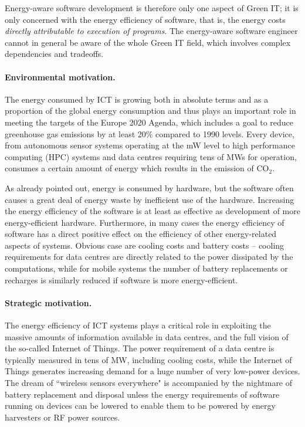 \documentclass[oneside]{book}
\begin{document}
Energy-aware software development is therefore only one aspect of Green IT;  it is only concerned with the energy efficiency of software, that is, the energy costs \emph{directly attributable to execution of programs}. The energy-aware software engineer cannot in general be aware of the whole Green IT field, which involves complex dependencies and tradeoffs. 



\paragraph{Environmental motivation.}
The energy consumed by ICT is growing both in absolute terms and as a proportion of the global energy consumption and thus plays an important role in meeting the targets of the Europe 2020 Agenda, which includes a goal to reduce greenhouse gas emissions by at least 20\% compared to 1990 levels.   Every device, from autonomous sensor systems operating at the mW level to high performance computing (HPC) systems and data centres requiring tens of MWs for operation, consumes a certain amount of energy which results in the emission of CO$_2$. 

As already pointed out, energy is consumed by hardware, but the software often causes a great deal of energy waste by inefficient use of the hardware.  Increasing the energy efficiency of the software is at least as effective as development of more energy-efficient hardware.
Furthermore, in many cases the energy efficiency of software has a direct positive effect on the efficiency of other energy-related aspects of systems.  Obvious case are cooling costs and battery costs -- cooling requirements for data centres are directly related to the power dissipated by the computations, while for mobile systems the number of battery replacements or recharges is similarly reduced if software is more energy-efficient.  

\paragraph{Strategic motivation.} 
The energy efficiency of ICT systems plays a critical role in exploiting the massive amounts of information available in data centres, and the full vision of the so-called Internet of Things.  The power requirement of a data centre is typically measured in tens of MW, including cooling costs, while the Internet of Things generates increasing demand for a huge number of very low-power devices. The dream of ``wireless sensors everywhere" is accompanied by the nightmare of battery replacement and disposal unless the energy requirements of software running on devices can be lowered to enable them to be powered by energy harvesters or RF power sources.
\end{document}

